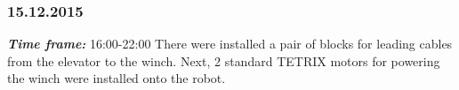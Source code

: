 \subsubsection{15.12.2015}
\textit{\textbf{Time frame:}} 16:00-22:00 \newline
There were installed a pair of blocks for leading cables from the elevator to the winch.
Next, 2 standard TETRIX motors for powering the winch were installed onto the robot.

\begin{figure}[H]
	\begin{minipage}[h]{0.58\linewidth}

\end{minipage}
\end{figure}
